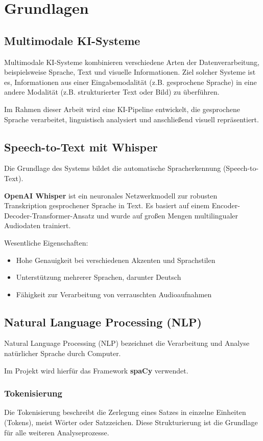 \chapter{Grundlagen}
\label{sec:grundlagen}

\section{Multimodale KI-Systeme}
Multimodale KI-Systeme kombinieren verschiedene Arten der Datenverarbeitung, beispielsweise Sprache, Text und visuelle Informationen. Ziel solcher Systeme ist es, Informationen aus einer Eingabemodalität (z.B. gesprochene Sprache) in eine andere Modalität (z.B. strukturierter Text oder Bild) zu überführen.

Im Rahmen dieser Arbeit wird eine KI-Pipeline entwickelt, die gesprochene Sprache verarbeitet, linguistisch analysiert und anschließend visuell repräsentiert.

\section{Speech-to-Text mit Whisper}
Die Grundlage des Systems bildet die automatische Spracherkennung (Speech-to-Text).

\textbf{OpenAI Whisper} ist ein neuronales Netzwerkmodell zur robusten Transkription gesprochener Sprache in Text. Es basiert auf einem Encoder-Decoder-Transformer-Ansatz und wurde auf großen Mengen multilingualer Audiodaten trainiert.

Wesentliche Eigenschaften:
\begin{itemize}
    \item Hohe Genauigkeit bei verschiedenen Akzenten und Sprachstilen
    \item Unterstützung mehrerer Sprachen, darunter Deutsch
    \item Fähigkeit zur Verarbeitung von verrauschten Audioaufnahmen
\end{itemize}

\section{Natural Language Processing (NLP)}
Natural Language Processing (NLP) bezeichnet die Verarbeitung und Analyse natürlicher Sprache durch Computer.

Im Projekt wird hierfür das Framework \textbf{spaCy} verwendet.

\subsection{Tokenisierung}
Die Tokenisierung beschreibt die Zerlegung eines Satzes in einzelne Einheiten (Tokens), meist Wörter oder Satzzeichen. Diese Strukturierung ist die Grundlage für alle weiteren Analyseprozesse.

